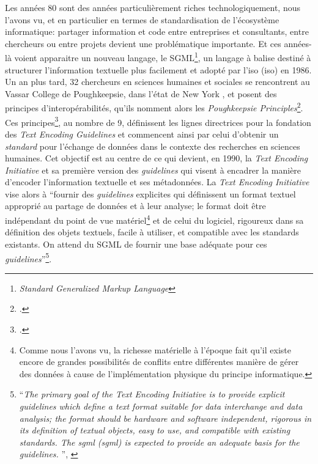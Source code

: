 Les années 80 sont des années particulièrement riches technologiquement, nous l'avons vu, et en particulier en termes de standardisation de l'écosystème informatique: partager information et code entre entreprises et consultants, entre chercheurs ou entre projets devient une problématique importante. Et ces années-là voient apparaitre un nouveau langage, le SGML\footnote{\textit{Standard Generalized Markup Language}}, un langage à balise destiné à structurer l'information textuelle plus facilement et adopté par l'\acrfull{iso} (\acrshort{iso}) en 1986. Un an plus tard, 32 chercheurs en sciences humaines et sociales se rencontrent au Vassar College de Poughkeepsie, dans l'état de New York , et posent des principes d'interopérabilités, qu'ils nomment alors les \textit{Poughkeepsie Principles}\footcite{vanhoutte_introduction_2004}. Ces principes\footcite{noauthor_design_1988}, au nombre de 9, définissent les lignes directrices pour la fondation des \textit{Text Encoding Guidelines} et commencent ainsi par celui d'obtenir un \textit{standard} pour l'échange de données dans le contexte des recherches en sciences humaines. Cet objectif est au centre de ce qui devient, en 1990, la \textit{Text Encoding Initiative} et sa première version des \textit{guidelines} qui visent à encadrer la manière d'encoder l'information textuelle et ses métadonnées. La \textit{Text Encoding Initiative} vise alors à \enquote{fournir des \textit{guidelines} explicites qui définissent un format textuel approprié au partage de données et à leur analyse; le format doit être indépendant du point de vue matériel\footnote{Comme nous l'avons vu, la richesse matérielle à l'époque fait qu'il existe encore de grandes possibilités de conflits entre différentes manière de gérer des données à cause de l'implémentation physique du principe informatique.} et de celui du logiciel, rigoureux dans sa définition des objets textuels, facile à utiliser, et compatible avec les standards existants. On attend du SGML de fournir une base adéquate pour ces \textit{guidelines}}\footnote{\enquote{\textit{The primary goal of the Text Encoding Initiative is to provide explicit guidelines which define a text format suitable for data interchange and data analysis; the format should be hardware and software independent, rigorous in its definition of textual objects, easy to use, and compatible with existing standards. The \acrlong{sgml} (\acrshort{sgml}) is expected to provide an adequate basis for the guidelines. }}, \cite{noauthor_design_1988}}.

